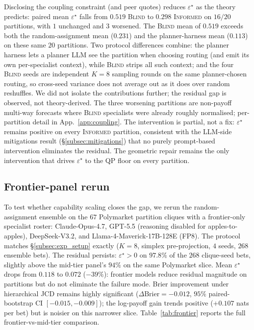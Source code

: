 \documentclass{article}
\theoremstyle{plain}
\theoremstyle{definition}
\theoremstyle{remark}
\newcommand{\eps}{\varepsilon}
\begin{document}
Disclosing the coupling constraint (and peer quotes) reduces
$\eps^\star$ as the theory predicts: paired mean $\eps^\star$
falls from $0.519$ \textsc{Blind} to $0.298$ \textsc{Informed}
on $16/20$ partitions, with $1$ unchanged and $3$ worsened.
The \textsc{Blind} mean of $0.519$ exceeds both the
random-assignment mean ($0.231$) and the planner-harness mean
($0.113$) on these same $20$ partitions. Two protocol differences
combine: the planner harness lets a planner LLM see the partition
when choosing routing (and emit its own per-specialist context),
while \textsc{Blind} strips all such context; and the four
\textsc{Blind} seeds are independent $K\!=\!8$ sampling rounds
on the same planner-chosen routing, so cross-seed variance does
not average out as it does over random reshuffles. We did not
isolate the contributions further; the residual gap is observed,
not theory-derived.
The three worsening partitions are non-payoff multi-way forecasts
where \textsc{Blind} specialists were already roughly normalised;
per-partition detail in App.~\ref{app:coupling}. The intervention is partial, not a
fix: $\eps^\star$ remains positive on every \textsc{Informed}
partition, consistent with the LLM-side mitigations result
(\S\ref{subsec:mitigations}) that no purely prompt-based
intervention eliminates the residual. The geometric repair
remains the only intervention that drives $\eps^\star$ to the
QP floor on every partition.

\subsection{Frontier-panel rerun}
\label{subsec:frontier}

To test whether capability scaling closes the gap, we rerun the
random-assignment ensemble on the $67$ Polymarket partition cliques
with a frontier-only specialist roster: Claude-Opus-4.7, GPT-5.5
(reasoning disabled for apples-to-apples), DeepSeek-V3.2, and
Llama-4-Maverick-17B-128E (FP8). The protocol matches
\S\ref{subsec:exp_setup} exactly ($K{=}8$, simplex pre-projection,
$4$ seeds, $268$ ensemble bets). The residual persists:
$\eps^\star\!>\!0$ on $97.8\%$ of the $268$ clique-seed bets,
slightly above the mid-tier panel's $94\%$ on the same Polymarket
slice. Mean $\eps^\star$ drops from $0.118$ to $0.072$ ($-39\%$):
frontier models reduce residual magnitude on partitions but do not
eliminate the failure mode. Brier improvement under hierarchical
JCD remains highly significant ($\Delta\mathrm{Brier} = -0.012$,
$95\%$ paired-bootstrap CI $[-0.015, -0.009]$); the log-payoff
gain trends positive ($+0.107$ nats per bet) but is noisier on
this narrower slice. Table~\ref{tab:frontier} reports the full
frontier-vs-mid-tier comparison.
\end{document}
